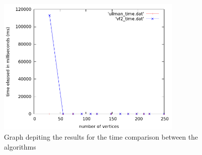 \label{Time Results}

\begin{figure}[H]
  \begin{center}
      \includegraphics[width=0.8\textwidth]{time_comparison.png}
  \end{center}    
  \caption{Graph depiting the results for the time comparison between the algorithms}
  \label{fig:time_comparison}
\end{figure}
